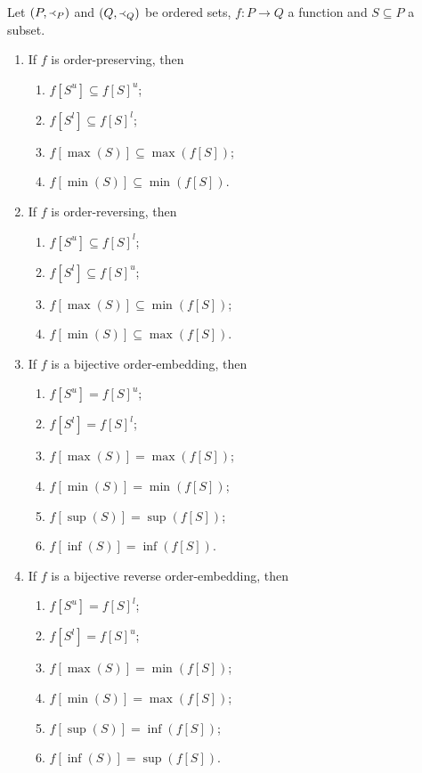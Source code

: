 \begin{lemma} \label{orderPreservingReversingBounds}
Let $(P, \Yleft_P)$ and $(Q, \Yleft_Q)$ be ordered sets, $f: P\to Q$ a function and $S\subseteq P$ a subset.
\begin{enumerate}
\item If $f$ is order-preserving, then
\begin{enumerate}
\item $f[S^u] \subseteq f[S]^u$;
\item $f[S^l] \subseteq f[S]^l$;
\item $f[\max(S)] \subseteq \max(f[S])$;
\item $f[\min(S)] \subseteq \min(f[S])$.
\end{enumerate}
\item If $f$ is order-reversing, then
\begin{enumerate}
\item $f[S^u] \subseteq f[S]^l$;
\item $f[S^l] \subseteq f[S]^u$;
\item $f[\max(S)] \subseteq \min(f[S])$;
\item $f[\min(S)] \subseteq \max(f[S])$.
\end{enumerate}
\item If $f$ is a bijective order-embedding, then
\begin{enumerate}
\item $f[S^u] = f[S]^u$;
\item $f[S^l] = f[S]^l$;
\item $f[\max(S)] = \max(f[S])$;
\item $f[\min(S)] = \min(f[S])$;
\item $f[\sup(S)] = \sup(f[S])$;
\item $f[\inf(S)] = \inf(f[S])$.
\end{enumerate}
\item If $f$ is a bijective reverse order-embedding, then
\begin{enumerate}
\item $f[S^u] = f[S]^l$;
\item $f[S^l] = f[S]^u$;
\item $f[\max(S)] = \min(f[S])$;
\item $f[\min(S)] = \max(f[S])$;
\item $f[\sup(S)] = \inf(f[S])$;
\item $f[\inf(S)] = \sup(f[S])$.
\end{enumerate}
\end{enumerate}
\end{lemma}
